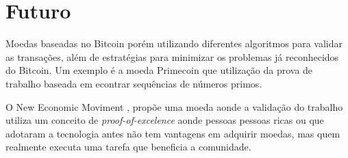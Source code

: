\documentclass[a4paper,11pt]{article}
\theoremstyle{mytheor}
\begin{document}
\section*{Futuro}

Moedas baseadas no Bitcoin porém utilizando diferentes algoritmos para validar as transações, além de estratégias para minimizar os problemas já reconhecidos do Bitcoin. Um exemplo é a moeda Primecoin que utilização da prova de trabalho baseada em econtrar sequências de números primos.

O New Economic Moviment \cite{nem}, propõe uma moeda aonde a validação do trabalho utiliza um conceito de \textit{proof-of-excelence} aonde pessoas pessoas ricas ou que adotaram a tecnologia antes não tem vantagens em adquirir moedas, mas quem realmente executa uma tarefa que beneficia a comunidade.


{}

\end{document}
